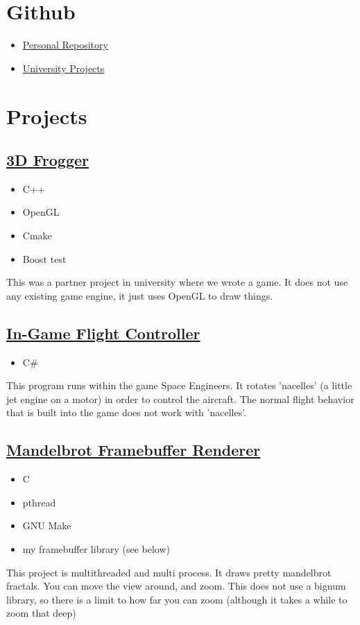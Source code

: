 \documentclass{amsart}
\theoremstyle{definition} %
\begin{document}
\pagebreak
\section{Github}
\begin{itemize}
	\item \href{https://github.com/1wsx10/}{Personal Repository}
	\item \href{https://github.com/s3543536/}{University Projects}
\end{itemize}

\section{Projects}

\subsection{\href{https://github.com/Hazelfire/I3DAssignment2}{3D Frogger}}
\begin{itemize}
	\item C++
	\item OpenGL
	\item Cmake
	\item Boost test
\end{itemize}
This was a partner project in university where we wrote a game.
It does not use any existing game engine, it just uses OpenGL to draw
things.

\subsection{\href{https://github.com/1wsx10/VectorThrust2}{In-Game Flight Controller}}
\begin{itemize}
	\item C\#
\end{itemize}
This program runs within the game Space Engineers. It rotates
'nacelles' (a little jet engine on a motor) in order to control the
aircraft. The normal flight behavior that is built into the game does
not work with 'nacelles'.

\subsection{\href{https://github.com/1wsx10/mandelbrot}{Mandelbrot Framebuffer Renderer}}
\begin{itemize}
	\item C
	\item pthread
	\item GNU Make
	\item my framebuffer library (see below)
\end{itemize}
This project is multithreaded and multi process. It draws pretty
mandelbrot fractals. You can move the view around, and zoom.
This does not use a bignum library, so there is a limit to how far
you can zoom (although it takes a while to zoom that deep)
\end{document}
